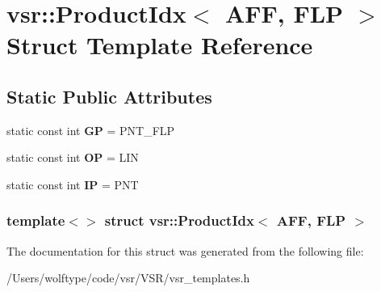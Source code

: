 \hypertarget{structvsr_1_1_product_idx_3_01_a_f_f_00_01_f_l_p_01_4}{\section{vsr\-:\-:Product\-Idx$<$ A\-F\-F, F\-L\-P $>$ Struct Template Reference}
\label{structvsr_1_1_product_idx_3_01_a_f_f_00_01_f_l_p_01_4}
}
\subsection*{Static Public Attributes}
\begin{DoxyCompactItemize}
\item 
\hypertarget{structvsr_1_1_product_idx_3_01_a_f_f_00_01_f_l_p_01_4_ac3237495fea12acb4a92f7f62ae99308}{static const int {\bfseries G\-P} = P\-N\-T\-\_\-\-F\-L\-P}\label{structvsr_1_1_product_idx_3_01_a_f_f_00_01_f_l_p_01_4_ac3237495fea12acb4a92f7f62ae99308}

\item 
\hypertarget{structvsr_1_1_product_idx_3_01_a_f_f_00_01_f_l_p_01_4_a45b052416e57bb0a03feb0ed78dd2fd1}{static const int {\bfseries O\-P} = L\-I\-N}\label{structvsr_1_1_product_idx_3_01_a_f_f_00_01_f_l_p_01_4_a45b052416e57bb0a03feb0ed78dd2fd1}

\item 
\hypertarget{structvsr_1_1_product_idx_3_01_a_f_f_00_01_f_l_p_01_4_a4455fcbcb6d379b4c6f15e7fa537ee4c}{static const int {\bfseries I\-P} = P\-N\-T}\label{structvsr_1_1_product_idx_3_01_a_f_f_00_01_f_l_p_01_4_a4455fcbcb6d379b4c6f15e7fa537ee4c}

\end{DoxyCompactItemize}
\subsubsection*{template$<$$>$ struct vsr\-::\-Product\-Idx$<$ A\-F\-F, F\-L\-P $>$}



The documentation for this struct was generated from the following file\-:\begin{DoxyCompactItemize}
\item 
/\-Users/wolftype/code/vsr/\-V\-S\-R/vsr\-\_\-templates.\-h\end{DoxyCompactItemize}
